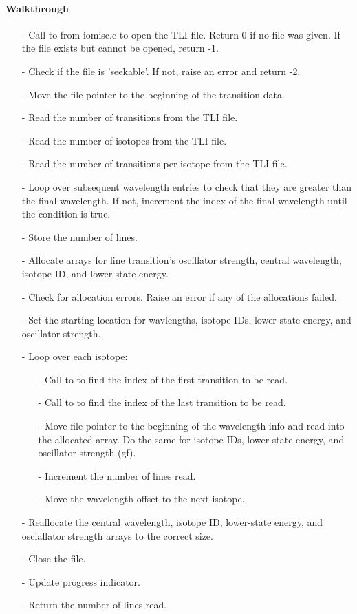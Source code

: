 \documentclass[letterpaper,12pt]{article}
\begin{document}
\paragraph{Walkthrough} 
\begin{enumerate}[leftmargin=10pt, noitemsep, parsep=0pt, topsep=0ex]
\item[-] Call to  from iomisc.c to open the TLI file. Return 0 if no file was given. If the file exists but cannot be opened, return -1.
\item[-] Check if the file is 'seekable'. If not, raise an error and return -2.
\item[-] Move the file pointer to the beginning of the transition data.
\item[-] Read the number of transitions from the TLI file.
\item[-] Read the number of isotopes from the TLI file.
\item[-] Read the number of transitions per isotope from the TLI file.
\item[-] Loop over subsequent wavelength entries to check that they are greater than the final wavelength. If not, increment the index of the final wavelength until the condition is true.
\item[-] Store the number of lines.
\item[-] Allocate arrays for line transition's oscillator strength, central wavelength, isotope ID, and lower-state energy.
\item[-] Check for allocation errors. Raise an error if any of the allocations failed.
\item[-] Set the starting location for wavlengths, isotope IDs, lower-state energy, and oscillator strength.
\item[-] Loop over each isotope:
\begin{enumerate}[leftmargin=10pt, noitemsep, parsep=0pt, topsep=0ex]
\item[-] Call to  to find the index of the first transition to be read.
\item[-] Call to  to find the index of the last transition to be read.
\item[-] Move file pointer to the beginning of the wavelength info and read into the allocated array. Do the same for isotope IDs, lower-state energy, and oscillator strength (gf).
\item[-] Increment the number of lines read.
\item[-] Move the wavelength offset to the next isotope.
\end{enumerate}
\item[-] Reallocate the central wavelength, isotope ID, lower-state energy, and osciallator strength arrays to the correct size.
\item[-] Close the file.
\item[-] Update progress indicator.
\item[-] Return the number of lines read.
\end{enumerate}
\end{document}
